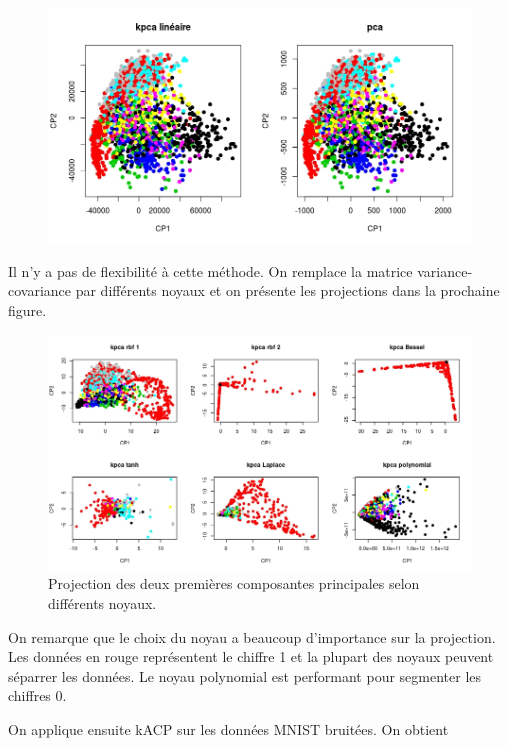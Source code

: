 \begin{figure}[H]
	\includegraphics[width=\textwidth]{comparaison-lineaire}
\end{figure}

Il n'y a pas de flexibilité à cette méthode. On remplace la matrice variance-covariance par différents noyaux et on présente les projections dans la prochaine figure. 

\begin{figure}[H]
	\includegraphics[width=\textwidth]{comparaison-kernel}
	\caption{Projection des deux premières composantes principales selon différents noyaux.}
\end{figure}

On remarque que le choix du noyau a beaucoup d'importance sur la projection. Les données en rouge représentent le chiffre 1 et la plupart des noyaux peuvent séparrer les données. Le noyau polynomial est performant pour segmenter les chiffres 0. 

On applique ensuite kACP sur les données MNIST bruitées. On obtient 

